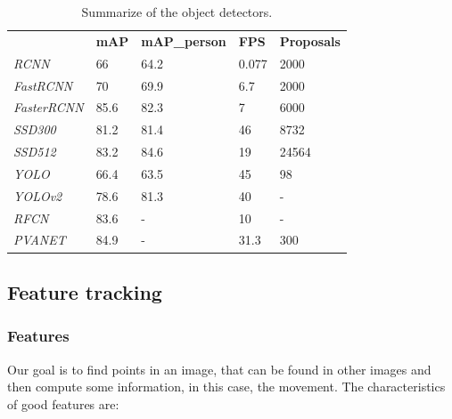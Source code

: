 \begin{table}[H]
\centering

\begin{tabular}{lllll}
                    & \textbf{mAP} & \textbf{mAP\_person} & \textbf{FPS} & \textbf{Proposals} \\
\textit{RCNN}       & 66           & 64.2                 & 0.077        & 2000               \\
\textit{FastRCNN}   & 70           & 69.9                 & 6.7          & 2000               \\
\textit{FasterRCNN} & 85.6         & 82.3                 & 7            & 6000               \\
\textit{SSD300}     & 81.2         & 81.4                 & 46           & 8732               \\
\textit{SSD512}     & 83.2         & 84.6                 & 19           & 24564              \\
\textit{YOLO}       & 66.4         & 63.5                 & 45           & 98                 \\
\textit{YOLOv2}     & 78.6         & 81.3                 & 40           & -                  \\
\textit{RFCN}       & 83.6         & -                    & 10           & -                  \\
\textit{PVANET}     & 84.9         & -                    & 31.3         & 300               
\end{tabular}

\caption{Summarize of the object detectors.}
\label{tableDet}
\end{table}


\subsection{Feature tracking}\label{matchi}


\subsubsection{Features}\label{feature}

Our goal is to find points in an image, that can be found in other images and then compute some information, in this case, the movement. The characteristics of good features are:

